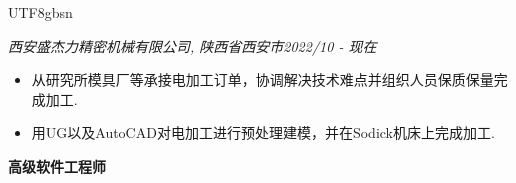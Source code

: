 \documentclass[3pt]{article}
\newenvironment{changemargin}[2]{%
  \begin{list}{}{%
    \setlength{\topsep}{0pt}%
    \setlength{\leftmargin}{#1}%
    \setlength{\rightmargin}{#2}%
    \setlength{\listparindent}{\parindent}%
    \setlength{\itemindent}{\parindent}%
    \setlength{\parsep}{\parskip}%
  }%
  \item[]}{\end{list}
}
\newenvironment{body} {
	\vspace*{-16pt}
	\begin{changemargin}{-0.25in}{-0.5in}
  }	
	{\end{changemargin}
}
\begin{document}
\begin{CJK}{UTF8}{gbsn}
\begin{body}
    \emph{西安盛杰力精密机械有限公司, 陕西省西安市}\hfill \emph{2022/10 - 现在}\\
     \begin{itemize} \itemsep -0.5pt
	\item {从研究所模具厂等承接电加工订单，协调解决技术难点并组织人员保质保量完成加工.}
	\item {用UG以及AutoCAD对电加工进行预处理建模，并在Sodick机床上完成加工.}
     \end{itemize}

	\vspace{5pt}
	
   \textbf{高级软件工程师} \\
   \vspace{1pt}


\end{body}
\end{CJK}
\end{document}
